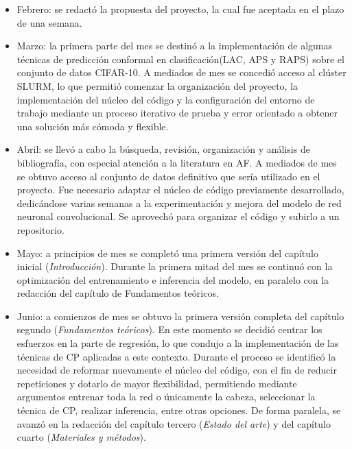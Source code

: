 \begin{itemize}

    \item Febrero: se redactó la propuesta del proyecto, la cual fue aceptada en el plazo de una semana.
    
    \item Marzo: la primera parte del mes se destinó a la implementación de algunas técnicas de predicción conformal en clasificación(\acrshort{LAC}, \acrshort{APS} y \acrshort{RAPS}) sobre el conjunto de datos CIFAR-10. A mediados de mes se concedió acceso al clúster SLURM, lo que permitió comenzar la organización del proyecto, la implementación del núcleo del código y la configuración del entorno de trabajo mediante un proceso iterativo de prueba y error orientado a obtener una solución más cómoda y flexible.
    
    \item Abril: se llevó a cabo la búsqueda, revisión, organización y análisis de bibliografía, con especial atención a la literatura en \acrshort{AF}. A mediados de mes se obtuvo acceso al conjunto de datos definitivo que sería utilizado en el proyecto. Fue necesario adaptar el núcleo de código previamente desarrollado, dedicándose varias semanas a la experimentación y mejora del modelo de red neuronal convolucional. Se aprovechó para organizar el código y subirlo a un repositorio. 

    \item Mayo: a principios de mes se completó una primera versión del capítulo inicial (\textit{Introducción}). Durante la primera mitad del mes se continuó con la optimización del entrenamiento e inferencia del modelo, en paralelo con la redacción del capítulo de Fundamentos teóricos.

    \item Junio: a comienzos de mes se obtuvo la primera versión completa del capítulo segundo (\textit{Fundamentos teóricos}). En este momento se decidió centrar los esfuerzos en la parte de regresión, lo que condujo a la implementación de las técnicas de \acrshort{CP} aplicadas a este contexto. Durante el proceso se identificó la necesidad de reformar nuevamente el núcleo del código, con el fin de reducir repeticiones y dotarlo de mayor flexibilidad, permitiendo mediante argumentos entrenar toda la red o únicamente la cabeza, seleccionar la técnica de \acrshort{CP}, realizar inferencia, entre otras opciones. De forma paralela, se avanzó en la redacción del capítulo tercero (\textit{Estado del arte}) y del capítulo cuarto (\textit{Materiales y métodos}).


\end{itemize}
